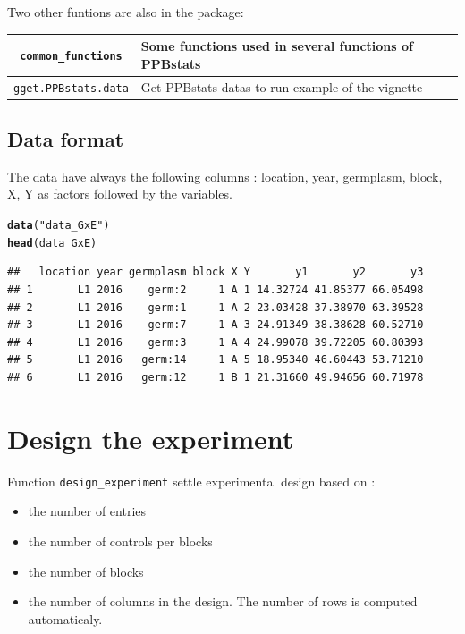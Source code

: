 \documentclass{book}\usepackage[]{graphicx}\usepackage[]{color}
\makeatletter
\newcommand{\hlstr}[1]{\textcolor[rgb]{0.192,0.494,0.8}{#1}}%
\newcommand{\hlstd}[1]{\textcolor[rgb]{0.345,0.345,0.345}{#1}}%
\newcommand{\hlkwd}[1]{\textcolor[rgb]{0.737,0.353,0.396}{\textbf{#1}}}%
\newenvironment{kframe}{%
 \def\at@end@of@kframe{}%
 \ifinner\ifhmode%
  \def\at@end@of@kframe{\end{minipage}}%
  \begin{minipage}{\columnwidth}%
 \fi\fi%
 \def\FrameCommand##1{\hskip\@totalleftmargin \hskip-\fboxsep
 \colorbox{shadecolor}{##1}\hskip-\fboxsep
     \hskip-\linewidth \hskip-\@totalleftmargin \hskip\columnwidth}%
 \MakeFramed {\advance\hsize-\width
   \@totalleftmargin\z@ \linewidth\hsize
   \@setminipage}}%
 {\par\unskip\endMakeFramed%
 \at@end@of@kframe}
\newenvironment{knitrout}{}{} %
\makeatother
\begin{document}
Two other funtions are also in the package:


\begin{table}[H]\begin{center}
\begin{tabular}{cl}
\hline
\texttt{common\_functions} & Some functions used in several functions of PPBstats \\ \hline
\texttt{gget.PPBstats.data} & Get PPBstats datas to run example of the vignette \\ \hline
\end{tabular}
\end{center}\end{table}



\subsection{Data format}

The data have always the following columns : location, year, germplasm, block, X, Y as factors followed by the variables.
\begin{knitrout}
\color{fgcolor}\begin{kframe}
\begin{alltt}
\hlkwd{data}\hlstd{(}\hlstr{"data_GxE"}\hlstd{)}
\hlkwd{head}\hlstd{(data_GxE)}
\end{alltt}
\begin{verbatim}
##   location year germplasm block X Y       y1       y2       y3
## 1       L1 2016    germ:2     1 A 1 14.32724 41.85377 66.05498
## 2       L1 2016    germ:1     1 A 2 23.03428 37.38970 63.39528
## 3       L1 2016    germ:7     1 A 3 24.91349 38.38628 60.52710
## 4       L1 2016    germ:3     1 A 4 24.99078 39.72205 60.80393
## 5       L1 2016   germ:14     1 A 5 18.95340 46.60443 53.71210
## 6       L1 2016   germ:12     1 B 1 21.31660 49.94656 60.71978
\end{verbatim}
\end{kframe}
\end{knitrout}

\newpage


\section{Design the experiment}
\label{doe}


Function \texttt{design\_experiment} settle experimental design based on :
\begin{itemize}
\item the number of entries
\item the number of controls per blocks
\item the number of blocks
\item the number of columns in the design. The number of rows is computed automaticaly.
\end{itemize}
\end{document}
